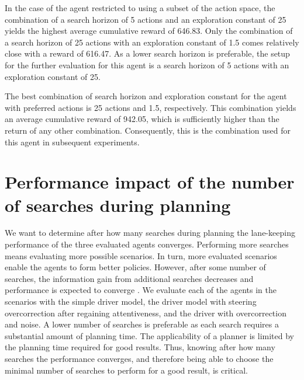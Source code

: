 In the case of the agent restricted to using a subset of the action space, the combination of a search horizon of 5 actions and an exploration constant of 25 yields the highest average cumulative reward of 646.83. Only the combination of a search horizon of 25 actions with an exploration constant of 1.5 comes relatively close with a reward of 616.47. As a lower search horizon is preferable, the setup for the further evaluation for this agent is a search horizon of 5 actions with an exploration constant of 25. 

The best combination of search horizon and exploration constant for the agent with preferred actions is 25 actions and 1.5, respectively. This combination yields an average cumulative reward of 942.05, which is sufficiently higher than the return of any other combination. Consequently, this is the combination used for this agent in subsequent experiments.

\section{Performance impact of the number of searches during planning}
\label{sec:convergence}





We want to determine after how many searches during planning the lane-keeping performance of the three evaluated agents converges. Performing more searches means evaluating more possible scenarios. In turn, more evaluated scenarios enable the agents to form better policies. However, after some number of searches, the information gain from additional searches decreases and performance is expected to converge \parencite{pomcp}. We evaluate each of the agents in the scenarios with the simple driver model, the driver model with steering overcorrection after regaining attentiveness, and the driver with overcorrection and noise. A lower number of searches is preferable as each search requires a substantial amount of planning time. The applicability of a planner is limited by the planning time required for good results. Thus, knowing after how many searches the performance converges, and therefore being able to choose the minimal number of searches to perform for a good result, is critical. 


